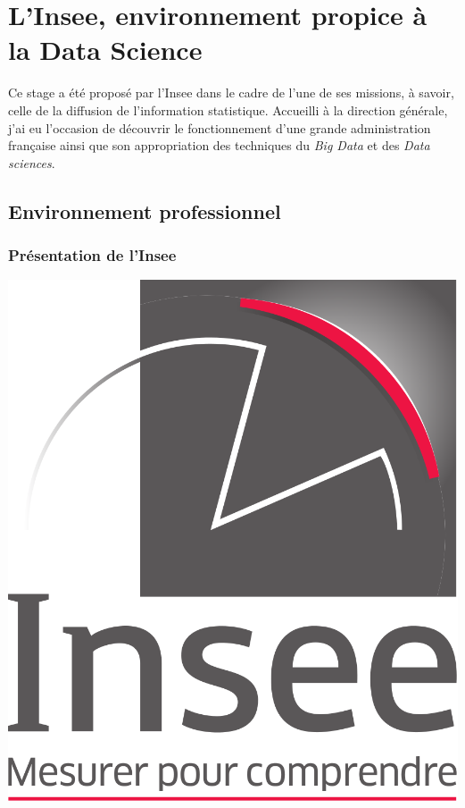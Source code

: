 \section{L'Insee, environnement propice à la Data Science}
Ce stage a été proposé par l'Insee dans le cadre de l'une de ses missions, à savoir, celle de la diffusion de l'information statistique. Accueilli à la direction générale, j'ai eu l'occasion de découvrir le fonctionnement d'une grande administration française ainsi que son appropriation des techniques du \textit{Big Data} et des \textit{Data sciences}.

\subsection{Environnement professionnel}

\subsubsection{Présentation de l'Insee}
\vspace{10pt}
\begin{center}
\includegraphics[scale=0.12]{images/Logo_Insee.png} 
\end{center}

